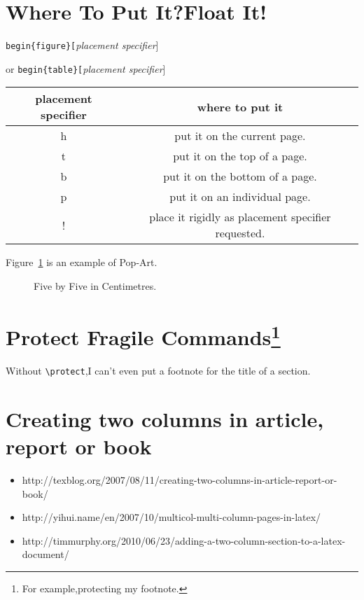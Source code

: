 \section{Where To Put It?Float It!}

\verb|begin{figure}[|\emph{placement specifier}]

or
\verb|begin{table}[|\emph{placement specifier}]

\begin{tabular}{c @{} c}

placement specifier & where to put it\\

\hline
h & put it on the current page. \\

t & put it on the top of a page.\\

b & put it on the bottom of a page.\\

p & put it on an individual page.\\

! & place it rigidly as placement specifier requested.\\

\hline
\end{tabular}

Figure~\ref{Empty} is an example of Pop-Art.

\begin{figure}[!hbp]

\makebox[\textwidth]{\framebox[5cm]{\rule{0pt}{5cm}}} \caption{Five
by Five in Centimetres.} \label{Empty}

\end{figure}

\section{Protect Fragile Commands\protect\footnote{For example,protecting my footnote.}}

Without \verb|\protect|,I can't even put a footnote for the title of
a section.

\section{Creating two columns in article, report or book}

\begin{itemize}
\item http://texblog.org/2007/08/11/creating-two-columns-in-article-report-or-book/
\item http://yihui.name/en/2007/10/multicol-multi-column-pages-in-latex/
\item http://timmurphy.org/2010/06/23/adding-a-two-column-section-to-a-latex-document/
\end{itemize}

